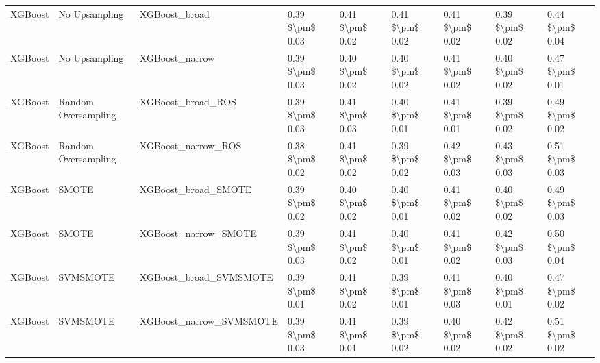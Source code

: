 \begin{tabular}{lllllllll}
                        XGBoost &                 No Upsampling &                                XGBoost\_broad & 0.39 \$\textbackslash pm\$ 0.03 &           0.41 \$\textbackslash pm\$ 0.02 &       0.41 \$\textbackslash pm\$ 0.02 &        0.41 \$\textbackslash pm\$ 0.02 &                         0.39 \$\textbackslash pm\$ 0.02 &     0.44 \$\textbackslash pm\$ 0.04 \\
                        XGBoost &                 No Upsampling &                               XGBoost\_narrow & 0.39 \$\textbackslash pm\$ 0.03 &           0.40 \$\textbackslash pm\$ 0.02 &       0.40 \$\textbackslash pm\$ 0.02 &        0.41 \$\textbackslash pm\$ 0.02 &                         0.40 \$\textbackslash pm\$ 0.02 &     0.47 \$\textbackslash pm\$ 0.01 \\
                        XGBoost &           Random Oversampling &                            XGBoost\_broad\_ROS & 0.39 \$\textbackslash pm\$ 0.03 &           0.41 \$\textbackslash pm\$ 0.03 &       0.40 \$\textbackslash pm\$ 0.01 &        0.41 \$\textbackslash pm\$ 0.01 &                         0.39 \$\textbackslash pm\$ 0.02 &     0.49 \$\textbackslash pm\$ 0.02 \\
                        XGBoost &           Random Oversampling &                           XGBoost\_narrow\_ROS & 0.38 \$\textbackslash pm\$ 0.02 &           0.41 \$\textbackslash pm\$ 0.02 &       0.39 \$\textbackslash pm\$ 0.02 &        0.42 \$\textbackslash pm\$ 0.03 &                         0.43 \$\textbackslash pm\$ 0.03 &     0.51 \$\textbackslash pm\$ 0.03 \\
                        XGBoost &                         SMOTE &                          XGBoost\_broad\_SMOTE & 0.39 \$\textbackslash pm\$ 0.02 &           0.40 \$\textbackslash pm\$ 0.02 &       0.40 \$\textbackslash pm\$ 0.01 &        0.41 \$\textbackslash pm\$ 0.02 &                         0.40 \$\textbackslash pm\$ 0.02 &     0.49 \$\textbackslash pm\$ 0.03 \\
                        XGBoost &                         SMOTE &                         XGBoost\_narrow\_SMOTE & 0.39 \$\textbackslash pm\$ 0.03 &           0.41 \$\textbackslash pm\$ 0.02 &       0.40 \$\textbackslash pm\$ 0.01 &        0.41 \$\textbackslash pm\$ 0.02 &                         0.42 \$\textbackslash pm\$ 0.03 &     0.50 \$\textbackslash pm\$ 0.04 \\
                        XGBoost &                      SVMSMOTE &                       XGBoost\_broad\_SVMSMOTE & 0.39 \$\textbackslash pm\$ 0.01 &           0.41 \$\textbackslash pm\$ 0.02 &       0.39 \$\textbackslash pm\$ 0.01 &        0.41 \$\textbackslash pm\$ 0.03 &                         0.40 \$\textbackslash pm\$ 0.01 &     0.47 \$\textbackslash pm\$ 0.02 \\
                        XGBoost &                      SVMSMOTE &                      XGBoost\_narrow\_SVMSMOTE & 0.39 \$\textbackslash pm\$ 0.03 &           0.41 \$\textbackslash pm\$ 0.01 &       0.39 \$\textbackslash pm\$ 0.02 &        0.40 \$\textbackslash pm\$ 0.02 &                         0.42 \$\textbackslash pm\$ 0.02 &     0.51 \$\textbackslash pm\$ 0.02 \\
\bottomrule
\end{tabular}
